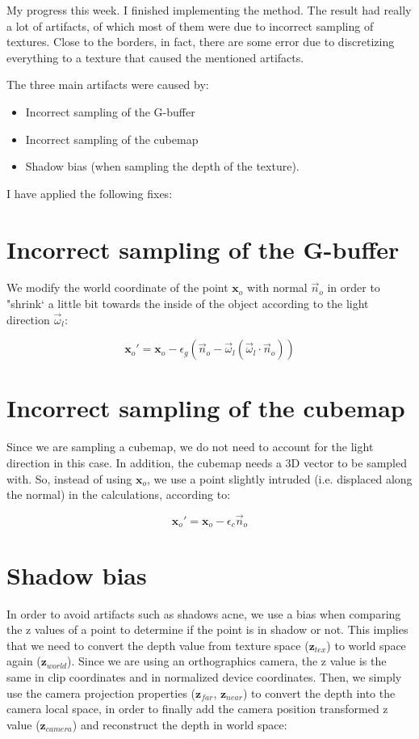 \documentclass[12pt, twoside,a4paper]{article}
\begin{document}
My progress this week. I finished implementing the method. The result had really a lot of artifacts, of which most of them were due to incorrect sampling of textures. Close to the borders, in fact, there are some error due to discretizing everything to a texture that caused the mentioned artifacts. 

The three main artifacts were caused by:
\begin{itemize}
	\item Incorrect sampling of the G-buffer
	\item Incorrect sampling of the cubemap
	\item Shadow bias (when sampling the depth of the texture).
\end{itemize}

I have applied the following fixes:

\section{Incorrect sampling of the G-buffer}

We modify the world coordinate of the point $\mathbf{x}_o$ with normal $\vec{n}_o$ in order to "shrink` a little bit towards the inside of the object according to the light direction $\vec{\omega}_l$:

$$
\mathbf{x}_o' = \mathbf{x}_o - \epsilon_g (\vec{n}_o - \vec{\omega}_l ( \vec{\omega}_l \cdot  \vec{n}_o))
$$

\section{Incorrect sampling of the cubemap}

Since we are sampling a cubemap, we do not need to account for the light direction in this case. In addition, the cubemap needs a 3D vector to be sampled with. So, instead of using $\mathbf{x}_o$, we use a point slightly intruded (i.e. displaced along the normal) in the calculations, according to:

$$
\mathbf{x}_o' = \mathbf{x}_o - \epsilon_c \vec{n}_o
$$

\section{Shadow bias}

In order to avoid artifacts such as shadows acne, we use a bias when comparing the z values of a point to determine if the point is in shadow or not. This implies that we need to convert the depth value from texture space ($\mathbf{z}_{tex}$) to world space again ($\mathbf{z}_{world}$). Since we are using an orthographics camera, the z value is the same in clip coordinates and in normalized device coordinates. Then, we simply use the camera projection properties ($\mathbf{z}_{far}$, $\mathbf{z}_{near}$) to convert the depth into the camera local space, in order to finally add the camera position transformed z value ($\mathbf{z}_{camera}$) and reconstruct the depth in world space:
\end{document}
